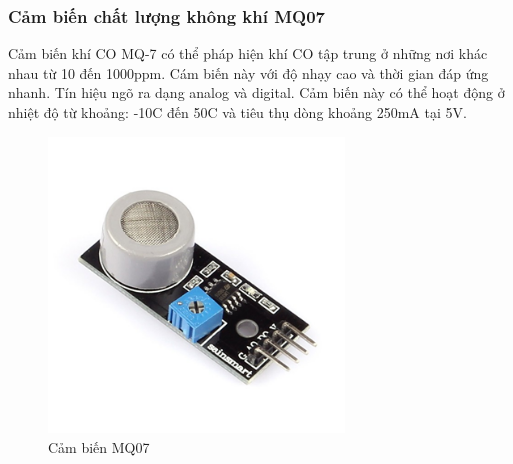 \newpage
\subsubsection*{Cảm biến chất lượng không khí MQ07} 
Cảm biến khí CO MQ-7 có thể pháp hiện khí CO tập trung ở những nơi khác nhau từ 10 đến 1000ppm. Cám biến này với độ nhạy cao và thời gian đáp ứng nhanh. Tín hiệu ngõ ra dạng analog và digital. Cảm biến này có thể hoạt động ở nhiệt độ từ khoảng: -10C đến 50C và tiêu thụ dòng khoảng 250mA tại 5V.
\begin{figure}[H]
\centering    
\includegraphics[width=0.7\textwidth]{mq07}
\caption[Cảm biến MQ07]{Cảm biến MQ07}
\label{fig:mq07}
\end{figure}


